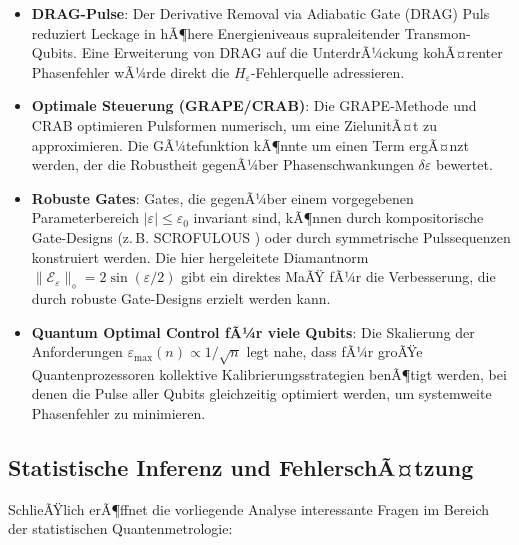 ﻿\documentclass[11pt,a4paper]{article}
\theoremstyle{definition}
\newcommand{\eps}{\varepsilon}
\newcommand{\Heps}{H_{\!\varepsilon}}
\newcommand{\Fdiam}{\|\mathcal{E}_\eps\|_\diamond}
\begin{document}
\begin{itemize}
  \item \textbf{DRAG-Pulse}: Der Derivative Removal via Adiabatic Gate
        (DRAG) Puls \cite{Motzoi2009} reduziert Leckage in hÃ¶here Energieniveaus
        supraleitender Transmon-Qubits.  Eine Erweiterung von DRAG auf die
        UnterdrÃ¼ckung kohÃ¤renter Phasenfehler wÃ¼rde direkt die
        $\Heps$-Fehlerquelle adressieren.

  \item \textbf{Optimale Steuerung (GRAPE/CRAB)}: Die GRAPE-Methode
        \cite{Khaneja2005} und CRAB \cite{Caneva2011} optimieren Pulsformen
        numerisch, um eine ZielunitÃ¤t zu approximieren.  Die GÃ¼tefunktion
        kÃ¶nnte um einen Term ergÃ¤nzt werden, der die Robustheit gegenÃ¼ber
        Phasenschwankungen $\delta\eps$ bewertet.

  \item \textbf{Robuste Gates}: Gates, die gegenÃ¼ber einem vorgegebenen
        Parameterbereich $|\eps| \leq \eps_0$ invariant sind, kÃ¶nnen durch
        kompositorische Gate-Designs (z.\,B. SCROFULOUS \cite{Cummins2003})
        oder durch symmetrische Pulssequenzen konstruiert werden.  Die
        hier hergeleitete Diamantnorm $\Fdiam = 2\sin(\eps/2)$ gibt ein
        direktes MaÃŸ fÃ¼r die Verbesserung, die durch robuste Gate-Designs
        erzielt werden kann.

  \item \textbf{Quantum Optimal Control fÃ¼r viele Qubits}: Die Skalierung
        der Anforderungen $\eps_{\max}(n) \propto 1/\sqrt{n}$ legt nahe, dass
        fÃ¼r groÃŸe Quantenprozessoren kollektive Kalibrierungsstrategien
        benÃ¶tigt werden, bei denen die Pulse aller Qubits gleichzeitig
        optimiert werden, um systemweite Phasenfehler zu minimieren.
\end{itemize}

\subsection{Statistische Inferenz und FehlerschÃ¤tzung}
\label{subsec:inference}

SchlieÃŸlich erÃ¶ffnet die vorliegende Analyse interessante Fragen im Bereich
der statistischen Quantenmetrologie:
\end{document}
